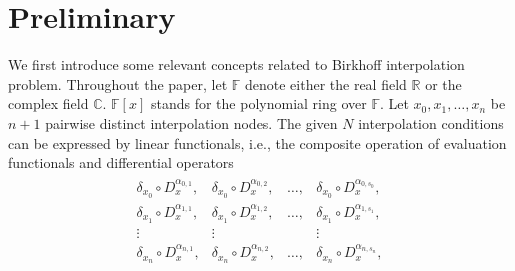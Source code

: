 \documentclass[preprint,12pt]{elsarticle}
\newtheorem{definition}{Definition}%
\begin{document}
\section{Preliminary}

We first introduce some relevant concepts  related to Birkhoff interpolation problem.
Throughout the paper, let $\mathbb{F}$ denote either the real field $\mathbb{R}$ or the complex field $\mathbb{C}$. $\mathbb{F}[x]$ stands for  the polynomial ring over $\mathbb{F}$. Let $x_0, x_1, \dots, x_n$ be  $n+1$ pairwise distinct interpolation nodes.  
The given $N$ interpolation conditions can be expressed by linear functionals, i.e., the composite operation of evaluation functionals and differential operators
\begin{align*}
   \begin{array}{cccc}
          \delta_{x_0}\circ D_x^{\alpha_{0,1}},& \delta_{x_0}\circ D_x^{\alpha_{0,2}},& \dots,& \delta_{x_0}\circ D_x^{\alpha_{0,s_0}}, \\
          \delta_{x_1}\circ D_x^{\alpha_{1,1}},& \delta_{x_1}\circ D_x^{\alpha_{1,2}},& \dots,& \delta_{x_1}\circ D_x^{\alpha_{1,s_1}}, \\
          \vdots & \vdots & ~ & \vdots\\
          \delta_{x_n}\circ D_x^{\alpha_{n,1}},& \delta_{x_n}\circ D_x^{\alpha_{n,2}},& \dots,& \delta_{x_n}\circ D_x^{\alpha_{n,s_n}}, \\
        \end{array} 
\end{align*}
\end{document}

